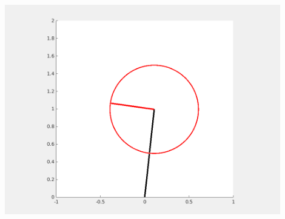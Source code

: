 \documentclass{article}
\begin{document}
\begin{itemize}
\begin{center}
	\includegraphics[width=0.9\textwidth]{figures/p2}
\end{center}

\bigskip
  

\end{itemize}




%
%




%
\end{document}
